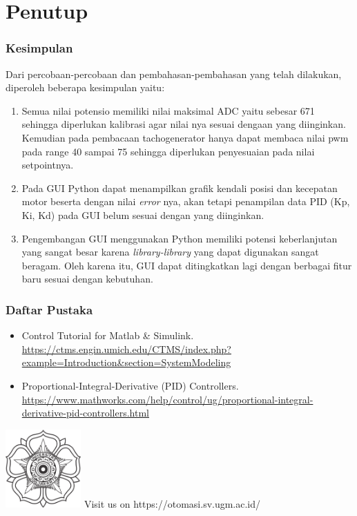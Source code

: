 \documentclass[10pt,xcolor={dvipsnames}]{beamer}
\begin{document}
	\section{Penutup}
		\begin{frame}
			\frametitle{Kesimpulan}
			Dari percobaan-percobaan dan pembahasan-pembahasan yang telah dilakukan, diperoleh beberapa kesimpulan yaitu:
			\begin{enumerate}
				\item Semua nilai potensio memiliki nilai maksimal ADC yaitu sebesar 671 sehingga diperlukan kalibrasi agar nilai nya sesuai dengaan yang diinginkan. Kemudian pada pembacaan tachogenerator hanya dapat membaca nilai pwm pada range 40 sampai 75 sehingga diperlukan penyesuaian pada nilai setpointnya. 
				\item Pada GUI Python dapat menampilkan grafik kendali posisi dan kecepatan motor beserta dengan nilai \textit{error} nya, akan tetapi penampilan data PID (Kp, Ki, Kd) pada GUI belum sesuai dengan yang diinginkan.
				\item Pengembangan GUI menggunakan Python memiliki potensi keberlanjutan yang sangat besar karena \textit{library-library} yang dapat digunakan sangat beragam. Oleh karena itu, GUI dapat ditingkatkan lagi dengan berbagai fitur baru sesuai dengan kebutuhan.
			\end{enumerate}
		\end{frame}
		
		\begin{frame}
			\frametitle{Daftar Pustaka}
			\begin{itemize}
				\item Control Tutorial for Matlab \& Simulink. \url{https://ctms.engin.umich.edu/CTMS/index.php?example=Introduction&section=SystemModeling}
				\item Proportional-Integral-Derivative (PID) Controllers. \url{https://www.mathworks.com/help/control/ug/proportional-integral-derivative-pid-controllers.html}
			\end{itemize}
		\end{frame}
		
		\begin{frame}
			\centering
		\end{frame}
		
		\begin{frame}
			\begin{Center}
				\includegraphics[height=3cm]{Lambang dan logo UGM/Lambang UGM-hitam.png}
				\vspace{0.5cm}
				\newline Visit us on https://otomasi.sv.ugm.ac.id/
			\end{Center}
		\end{frame}
		
	
\end{document}
